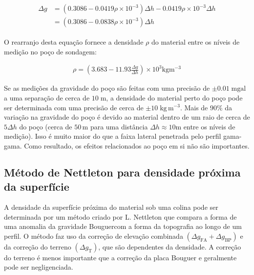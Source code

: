 \documentclass[]{book}
\theoremstyle{definition}
\theoremstyle{definition}
\theoremstyle{definition}
\theoremstyle{remark}
\begin{document}
\begin{align}
\begin{aligned} \Delta g &=\left(0.3086-0.0419 \rho \times 10^{-3}\right) \Delta h-0.0419 \rho \times 10^{-3} \Delta h \\ &=\left(0.3086-0.0838 \rho \times 10^{-3}\right) \Delta h \end{aligned}  \label{eq:0246}
\end{align}

O rearranjo desta equação fornece a densidade \(\rho\) do material entre os níveis de medição no poço de sondagem:

\begin{align}
\rho=\left(3.683-11.93 \frac{\Delta g}{\Delta h}\right) \times 10^{3} \mathrm{kg} \mathrm{m}^{-3} \label{eq:0247}
\end{align}

Se as medições da gravidade do poço são feitas com uma precisão de \(\pm 0.01\; \mathrm{mgal}\) a uma separação de cerca de \(10\;\mathrm{m}\), a densidade do material perto do poço pode ser determinada com uma precisão de cerca de \(\pm 10\; \mathrm{kg}\,\mathrm{m}^{-3}\). Mais de \(90 \%\) da variação na gravidade do poço é devido ao material dentro de um raio de cerca de \(5\Delta h\) do poço (cerca de \(50\,\mathrm{m}\) para uma distância \(\Delta h \approx 10\mathrm{m}\) entre os níveis de medição). Isso é muito maior do que a faixa lateral penetrada pelo perfil gama-gama. Como resultado, os efeitos relacionados ao poço em si não são importantes.

\hypertarget{metodo-de-nettleton-para-densidade-proxima-da-superficie}{%
\subsection{Método de Nettleton para densidade próxima da superfície}\label{metodo-de-nettleton-para-densidade-proxima-da-superficie}}

A densidade da superfície próxima do material sob uma colina pode ser determinada por um método criado por L. Nettleton que compara a forma de uma anomalia da gravidade Bouguercom a forma da topografia ao longo de um perfil. O método faz uso da correção de elevação combinada \(\left(\Delta g_{\mathrm{FA}}+\Delta g_{\mathrm{BP}}\right)\) e da correção do terreno \(\left(\Delta g_{\mathrm{T}}\right)\), que são dependentes da densidade. A correção do terreno é menos importante que a correção da placa Bouguer e geralmente pode ser negligenciada.
\end{document}
